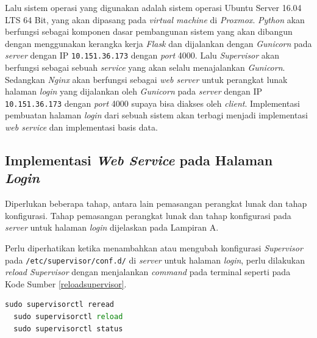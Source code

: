   Lalu sistem operasi yang digunakan adalah sistem operasi Ubuntu Server 16.04 LTS 64 Bit, yang akan dipasang pada \textit{virtual machine} di \textit{Proxmox}. \textit{Python} akan berfungsi sebagai komponen dasar pembangunan sistem yang akan dibangun dengan menggunakan kerangka kerja \textit{Flask} dan dijalankan dengan \textit{Gunicorn} pada \textit{server} dengan IP \texttt{10.151.36.173} dengan \textit{port} 4000. Lalu \textit{Supervisor} akan berfungsi sebagai sebuah \textit{service} yang akan selalu menajalankan \textit{Gunicorn}. Sedangkan \textit{Nginx} akan berfungsi sebagai \textit{web server} untuk perangkat lunak halaman \textit{login} yang dijalankan oleh \textit{Gunicorn} pada \textit{server} dengan IP \texttt{10.151.36.173} dengan \textit{port} 4000 supaya bisa diakses oleh \textit{client}. Implementasi pembuatan halaman \textit{login} dari sebuah sistem akan terbagi menjadi implementasi \textit{web service} dan implementasi basis data.
  
  \subsection{Implementasi \textit{Web Service} pada Halaman \textit{Login}}
  Diperlukan beberapa tahap, antara lain pemasangan perangkat lunak dan tahap konfigurasi. Tahap pemasangan perangkat lunak dan tahap konfigurasi pada \textit{server} untuk halaman \textit{login} dijelaskan pada Lampiran A. 
  
  Perlu diperhatikan ketika menambahkan atau mengubah konfigurasi \textit{Supervisor} pada \texttt{/etc/supervisor/conf.d/} di \textit{server} untuk halaman \textit{login}, perlu dilakukan \textit{reload Supervisor} dengan menjalankan \textit{command} pada terminal seperti pada Kode Sumber \ref{reloadsupervisor}.\\ 
  \begin{minipage}{\linewidth}
  \begin{lstlisting}[caption=Command untuk Reload Supervisor,language=Python,label=reloadsupervisor]
  sudo supervisorctl reread
  sudo supervisorctl reload
  sudo supervisorctl status
  \end{lstlisting}
  \end{minipage}

